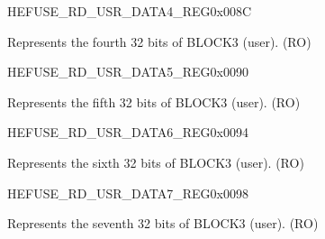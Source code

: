 \begin{register}{H}{EFUSE\_RD\_USR\_DATA4\_REG}{0x008C}\label{regdesc:EFUSERDUSRDATA4REG}
%
\regnewline%
\begin{regdesc}\begin{reglist}
\label{fielddesc:EFUSEUSRDATA4}\item [EFUSE\_USR\_DATA4] Represents the fourth 32 bits of BLOCK3 (user). (RO)
\end{reglist}\end{regdesc}
\end{register}


\begin{register}{H}{EFUSE\_RD\_USR\_DATA5\_REG}{0x0090}\label{regdesc:EFUSERDUSRDATA5REG}
%
\regnewline%
\begin{regdesc}\begin{reglist}
\label{fielddesc:EFUSEUSRDATA5}\item [EFUSE\_USR\_DATA5] Represents the fifth 32 bits of BLOCK3 (user). (RO)
\end{reglist}\end{regdesc}
\end{register}


\begin{register}{H}{EFUSE\_RD\_USR\_DATA6\_REG}{0x0094}\label{regdesc:EFUSERDUSRDATA6REG}
%
\regnewline%
\begin{regdesc}\begin{reglist}
\label{fielddesc:EFUSEUSRDATA6}\item [EFUSE\_USR\_DATA6] Represents the sixth 32 bits of BLOCK3 (user). (RO)
\end{reglist}\end{regdesc}
\end{register}


\begin{register}{H}{EFUSE\_RD\_USR\_DATA7\_REG}{0x0098}\label{regdesc:EFUSERDUSRDATA7REG}
%
\regnewline%
\begin{regdesc}\begin{reglist}
\label{fielddesc:EFUSEUSRDATA7}\item [EFUSE\_USR\_DATA7] Represents the seventh 32 bits of BLOCK3 (user). (RO)
\end{reglist}\end{regdesc}
\end{register}


